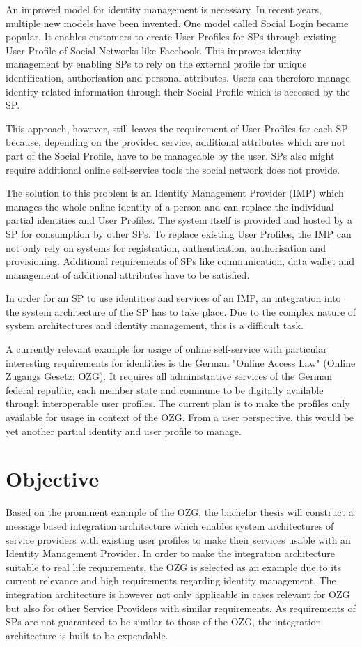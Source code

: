 \documentclass[
     12pt,         %
     a4paper,      %
     BCOR=10mm,version=first,     %
     DIV=14,version=first,        %
     ]{scrreprt}
\begin{document}
An improved model for identity management is necessary. In recent years, multiple new models have been invented. One model called Social Login became popular. It enables customers to create User Profiles for SPs through existing User Profile of Social Networks like Facebook. This improves identity management by enabling SPs to rely on the external profile for unique identification, authorisation and personal attributes. Users can therefore manage identity related information through their Social Profile which is accessed by the SP.

This approach, however, still leaves the requirement of User Profiles for each SP because, depending on the provided service, additional attributes which are not part of the Social Profile, have to be manageable by the user. SPs also might require additional online self-service tools the social network does not provide.

The solution to this problem is an Identity Management Provider (IMP) which manages the whole online identity of a person and can replace the individual partial identities and User Profiles. The system itself is provided and hosted by a SP for consumption by other SPs. To replace existing User Profiles, the IMP can not only rely on systems for registration, authentication, authorisation and provisioning. Additional requirements of SPs like communication, data wallet and management of additional attributes have to be satisfied.

In order for an SP to use identities and services of an IMP, an integration into the system architecture of the SP has to take place. Due to the complex nature of system architectures and identity management, this is a difficult task.

A currently relevant example for usage of online self-service with particular interesting requirements for identities is the German "Online Access Law" (Online Zugangs Gesetz: OZG). It requires all administrative services of the German federal republic, each member state and commune to be digitally available through interoperable user profiles. The current plan is to make the profiles only available for usage in context of the OZG. From a user perspective, this would be yet another partial identity and user profile to manage.

\chapter{Objective}
Based on the prominent example of the OZG, the bachelor thesis will construct a message based integration architecture which enables system architectures of service providers with existing user profiles to make their services usable with an Identity Management Provider. In order to make the integration architecture suitable to real life requirements, the OZG is selected as an example due to its current relevance and high requirements regarding identity management. The integration architecture is however not only applicable in cases relevant for OZG but also for other Service Providers with similar requirements. As requirements of SPs are not guaranteed to be similar to those of the OZG, the integration architecture is built to be expendable.
\end{document}
